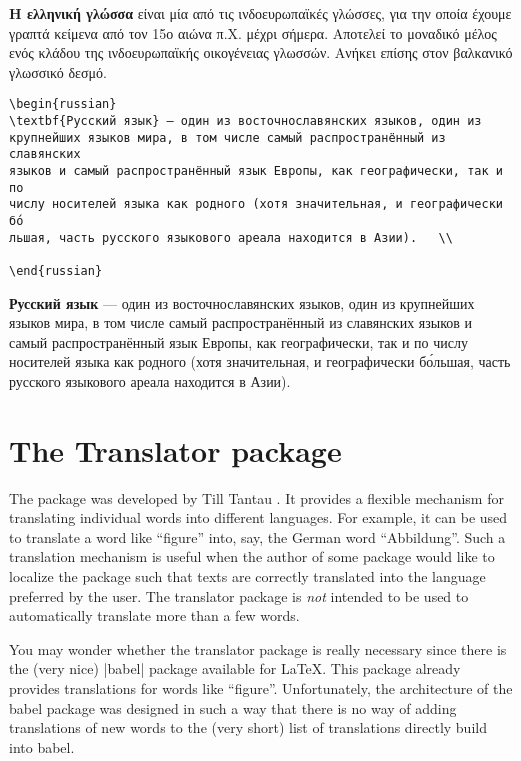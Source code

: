 \topline

\textbf{Η ελληνική γλώσσα} είναι μία από τις ινδοευρωπαϊκές γλώσσες, για την
οποία έχουμε γραπτά κείμενα από τον 15ο αιώνα π.Χ. μέχρι σήμερα. Αποτελεί το
μοναδικό μέλος ενός κλάδου της ινδοευρωπαϊκής οικογένειας γλωσσών. Ανήκει
επίσης στον βαλκανικό γλωσσικό δεσμό.\\	

\bottomline

\begin{verbatim}
\begin{russian}
\textbf{Русский язык} — один из восточнославянских языков, один из 
крупнейших языков мира, в том числе самый распространённый из славянских
языков и самый распространённый язык Европы, как географически, так и по
числу носителей языка как родного (хотя значительная, и географически бо́
льшая, часть русского языкового ареала находится в Азии).	\\

\end{russian}
\end{verbatim}



\textbf{Русский язык} — один из восточнославянских языков, один из крупнейших языков мира, в том числе самый распространённый из славянских языков и самый распространённый язык Европы, как географически, так и по числу носителей языка как родного (хотя значительная, и географически бо́льшая, часть русского языкового ареала находится в Азии).	\\





\section{The Translator package}

The  package was developed by Till Tantau \cite{translator}. It provides a flexible
mechanism for translating individual words into different languages.
For example, it can be used to translate a word like ``figure'' into,
say, the German word ``Abbildung''. Such a translation mechanism is
useful when the author of some package would like to localize the
package such that texts are correctly translated into the language
preferred by the user. The translator package is \emph{not} intended
to be used to automatically translate more than a few words. 

You may wonder whether the translator package is really necessary
since there is the (very nice) |babel| package available for
\LaTeX. This package already provides translations for words like
``figure''. Unfortunately, the architecture of the babel package was
designed in such a way that there is no way of adding translations of
new words to the (very short) list of translations directly build into
babel.

